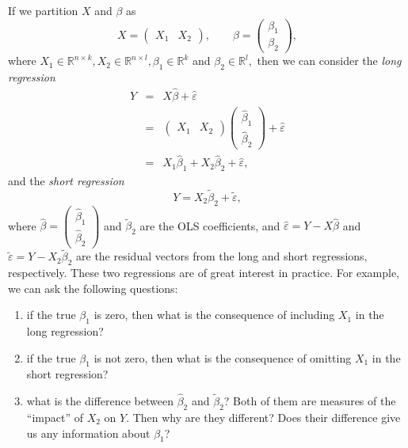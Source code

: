 If we partition $X$ and $\beta$ as
\[
X=\left(\begin{array}{cc}
X_{1} & X_{2}\end{array}\right),\qquad\beta=\left(\begin{array}{c}
\beta_{1}\\
\beta_{2}
\end{array}\right),
\]
where $X_{1}\in\mathbb{R}^{n\times k},X_{2}\in\mathbb{R}^{n\times l},\beta_{1}\in\mathbb{R}^{k}$
and $\beta_2 \in  \mathbb{R}^{l},$ then we can consider the {\it long regression} 
\begin{eqnarray*}
Y &=& X\hat{\beta}+\hat{\varepsilon}  \\
&=&\left(\begin{array}{cc}
X_{1} & X_{2}\end{array}\right)\left(\begin{array}{c}
\hat{\beta}_{1}\\
\hat{\beta}_{2}
\end{array}\right)+\hat{\varepsilon} \\
&=&X_{1}\hat{\beta}_{1}+X_{2}\hat{\beta}_{2}+\hat{\varepsilon},
\end{eqnarray*}
 and the {\it short regression} 
\[
Y=X_{2}\tilde{\beta}_{2}+\tilde{\varepsilon},
\]
where $\hat{\beta}=\left(\begin{array}{c}
\hat{\beta}_{1}\\
\hat{\beta}_{2}
\end{array}\right)$ and $\tilde{\beta}_{2}$ are the OLS coefficients, and $\hat{\varepsilon}  = Y - X\hat{\beta}$
and $\tilde{\varepsilon} = Y - X_{2}\tilde{\beta}_{2} $ are the residual vectors from the long
and short regressions, respectively. These two regressions are of great interest
in practice. For example, we can ask the following questions: 
\begin{enumerate}[label=(Q\arabic*), ref=Q\arabic*]
\item\label{question::fwl1} if the true $\beta_{1}$ is zero, then what is the consequence of including $X_1$ in the long regression?
\item\label{question::fwl2} if the true $\beta_{1}$ is not zero, then what is the consequence
of omitting $X_1$ in the short regression?
\item\label{question::fwl3} what is the difference between $\hat{\beta}_{2}$ and $\tilde{\beta}_{2}$?
Both of them are measures of the ``impact'' of $X_{2}$ on $Y$. Then
why are they different? Does their difference give us any information
about $\beta_{1}$?
\end{enumerate}

